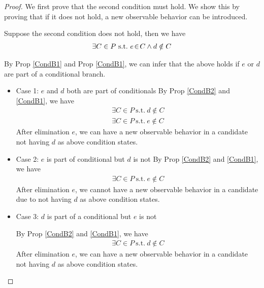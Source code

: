     \begin{proof}
        We first prove that the second condition must hold. We show this by proving that if it does not hold, a new observable behavior can be introduced. 
        
        Suppose the second condition does not hold, then we have 
        \begin{align*}
            \exists C \in P \ \text{s.t.} \  e\!\in\!C \wedge d \notin C
        \end{align*}

        By Prop \ref{CondB1} and Prop \ref{CondB1}, we can infer that the above holds if $e$ or $d$ are part of a conditional branch. 
        \begin{itemize}
            \item Case 1: $e$ and $d$ both are part of conditionals 
                By Prop \ref{CondB2} and \ref{CondB1}, we have 
                \begin{align*}
                    \exists C \in P \ \text{s.t.} \ d \notin C \\ 
                    \exists C \in P \ \text{s.t.} \ e \notin C 
                \end{align*}
                After elimination $e$, we can have a new observable behavior in a candidate not having $d$ as above condition states. 
                

            \item Case 2: $e$ is part of conditional but $d$ is not
                By Prop \ref{CondB2} and \ref{CondB1}, we have 
                \begin{align*}
                    \exists C \in P \ \text{s.t.} \ e \notin C 
                \end{align*}
                After elimination $e$, we cannot have a new observable behavior in a candidate due to not having $d$ as above condition states.

            \item Case 3: $d$ is part of a conditional but $e$ is not 

                By Prop \ref{CondB2} and \ref{CondB1}, we have 
                \begin{align*}
                    \exists C \in P \ \text{s.t.} \ d \notin C
                \end{align*}
                After elimination $e$, we can have a new observable behavior in a candidate not having $d$ as above condition states. 


\end{itemize}
\end{proof}
